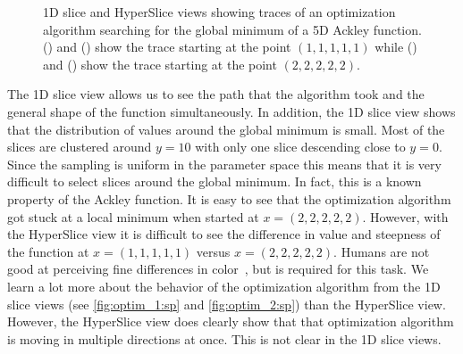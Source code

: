 \begin{figure}
\begin{subfigure}[b]{0.35\linewidth}
    \subcaption{
      \label{fig:optim_2:hs}
    }
  \end{subfigure}
  \caption{
    1D slice and HyperSlice views showing
    traces of an optimization algorithm searching for the global minimum
    of a 5D Ackley function.
    () and 
    () show the trace starting at the point
    $(1,1,1,1,1)$ while 
    () and 
    () 
    show the trace starting at the point $(2,2,2,2,2)$. 
  }
  \label{fig:optim_trace}
\end{figure}

The 1D slice view allows us to see the path that the algorithm took and the
general shape of the function simultaneously.  In addition, the 1D slice view
shows that the distribution of values around the global minimum is small. Most
of the slices are clustered around \(y=10\) with only one slice descending
close to \(y=0\). Since the sampling is uniform in the parameter space this
means that it is very difficult to select slices around the global minimum. In
fact, this is a known property of the Ackley function.  It is easy to see that
the optimization algorithm got stuck at a local minimum when started at
\(x=(2,2,2,2,2)\). However, with the HyperSlice view it is difficult to see the
difference in value and steepness of the function at \(x=(1,1,1,1,1)\) versus
\(x=(2,2,2,2,2)\).  Humans are not good at perceiving fine differences in
color~\cite{Munzner:2014}, but is required for this task. We learn a lot more
about the behavior of the optimization algorithm from the 1D slice views (see
\autoref{fig:optim_1:sp} and \autoref{fig:optim_2:sp}) than the HyperSlice
view. However, the HyperSlice view does clearly show that that optimization
algorithm is moving in multiple directions at once. This is not clear in the 1D
slice views.


